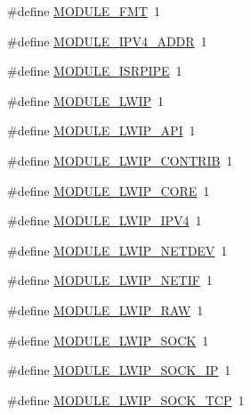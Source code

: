 \begin{DoxyCompactItemize}
\#define \hyperlink{openmote-cc2538_2riotbuild_2riotbuild_8h_ab17f406b1b901c682769cc78e52794b8}{M\+O\+D\+U\+L\+E\+\_\+\+F\+MT}~1
\item 
\#define \hyperlink{openmote-cc2538_2riotbuild_2riotbuild_8h_a9b2705a9a2090f1e3fb984da108a3514}{M\+O\+D\+U\+L\+E\+\_\+\+I\+P\+V4\+\_\+\+A\+D\+DR}~1
\item 
\#define \hyperlink{openmote-cc2538_2riotbuild_2riotbuild_8h_acceba6a6fc047b57f924b2ca90d436c7}{M\+O\+D\+U\+L\+E\+\_\+\+I\+S\+R\+P\+I\+PE}~1
\item 
\#define \hyperlink{openmote-cc2538_2riotbuild_2riotbuild_8h_a311650829bc97ca6fc6c98e6067b1ab0}{M\+O\+D\+U\+L\+E\+\_\+\+L\+W\+IP}~1
\item 
\#define \hyperlink{openmote-cc2538_2riotbuild_2riotbuild_8h_ae2381694f6d79b312736b8d4a8257730}{M\+O\+D\+U\+L\+E\+\_\+\+L\+W\+I\+P\+\_\+\+A\+PI}~1
\item 
\#define \hyperlink{openmote-cc2538_2riotbuild_2riotbuild_8h_a008f584dd030c3c7cc72f4a8356b7994}{M\+O\+D\+U\+L\+E\+\_\+\+L\+W\+I\+P\+\_\+\+C\+O\+N\+T\+R\+IB}~1
\item 
\#define \hyperlink{openmote-cc2538_2riotbuild_2riotbuild_8h_a30b87978eb4f27314d44f0ba0f5837a2}{M\+O\+D\+U\+L\+E\+\_\+\+L\+W\+I\+P\+\_\+\+C\+O\+RE}~1
\item 
\#define \hyperlink{openmote-cc2538_2riotbuild_2riotbuild_8h_a3e2f343763e6f5f9663e6e808d530bf7}{M\+O\+D\+U\+L\+E\+\_\+\+L\+W\+I\+P\+\_\+\+I\+P\+V4}~1
\item 
\#define \hyperlink{openmote-cc2538_2riotbuild_2riotbuild_8h_a19e2e8ae530daf8c28eed198b5ae35bc}{M\+O\+D\+U\+L\+E\+\_\+\+L\+W\+I\+P\+\_\+\+N\+E\+T\+D\+EV}~1
\item 
\#define \hyperlink{openmote-cc2538_2riotbuild_2riotbuild_8h_a135a19d820b02380b56860f2aa756fce}{M\+O\+D\+U\+L\+E\+\_\+\+L\+W\+I\+P\+\_\+\+N\+E\+T\+IF}~1
\item 
\#define \hyperlink{openmote-cc2538_2riotbuild_2riotbuild_8h_a9885b01945310b9b53452ea42d607415}{M\+O\+D\+U\+L\+E\+\_\+\+L\+W\+I\+P\+\_\+\+R\+AW}~1
\item 
\#define \hyperlink{openmote-cc2538_2riotbuild_2riotbuild_8h_a4b48cefe3084b8f31592850533cfa542}{M\+O\+D\+U\+L\+E\+\_\+\+L\+W\+I\+P\+\_\+\+S\+O\+CK}~1
\item 
\#define \hyperlink{openmote-cc2538_2riotbuild_2riotbuild_8h_a8938137d6d583f71b264a6f63f2fb24e}{M\+O\+D\+U\+L\+E\+\_\+\+L\+W\+I\+P\+\_\+\+S\+O\+C\+K\+\_\+\+IP}~1
\item 
\#define \hyperlink{openmote-cc2538_2riotbuild_2riotbuild_8h_a891b0ea3665ac6682a2dfa149541b9df}{M\+O\+D\+U\+L\+E\+\_\+\+L\+W\+I\+P\+\_\+\+S\+O\+C\+K\+\_\+\+T\+CP}~1

\end{DoxyCompactItemize}
